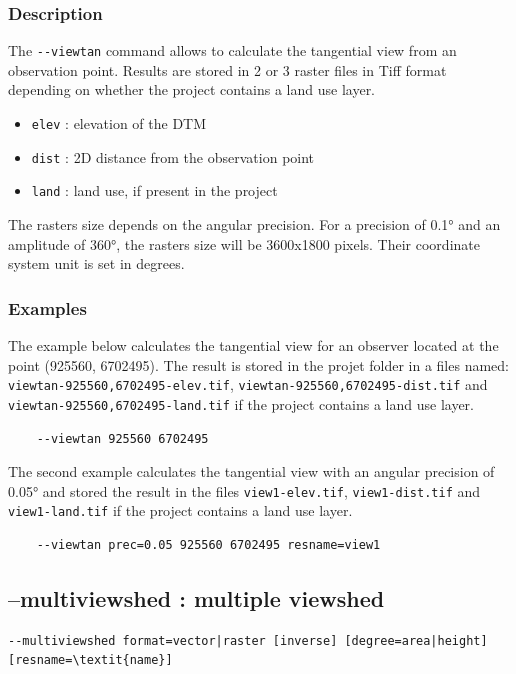 \documentclass{report}
\begin{document}
\subsubsection{Description}
The \verb|--viewtan| command allows to calculate the tangential view from an observation point. Results are stored in 2 or 3 raster files in Tiff format depending on whether the project contains a land use layer.
\begin{itemize}
	\item \verb|elev| : elevation of the DTM
	\item \verb|dist| : 2D distance from the observation point
	\item \verb|land| : land use, if present in the project
\end{itemize}

The rasters size depends on the angular precision. For a precision of 0.1° and an amplitude of 360°, the rasters size will be 3600x1800 pixels. Their coordinate system unit is set in degrees.

\subsubsection{Examples}
The example below calculates the tangential view for an observer located at the point (925560, 6702495). The result is stored in the projet folder in a files named: \verb|viewtan-925560,6702495-elev.tif|, \verb|viewtan-925560,6702495-dist.tif| and \verb|viewtan-925560,6702495-land.tif| if the project contains a land use layer.
\begin{Verbatim}
	--viewtan 925560 6702495
\end{Verbatim}

The second example calculates the tangential view with an angular precision of 0.05° and stored the result in the files \verb|view1-elev.tif|, \verb|view1-dist.tif| and \verb|view1-land.tif| if the project contains a land use layer.
\begin{Verbatim}
	--viewtan prec=0.05 925560 6702495 resname=view1
\end{Verbatim}


\subsection{--multiviewshed : multiple viewshed}
\begin{Verbatim}[commandchars=\\\{\}]
--multiviewshed format=vector|raster [inverse] [degree=area|height] [resname=\textit{name}]
\end{Verbatim}
\end{document}

